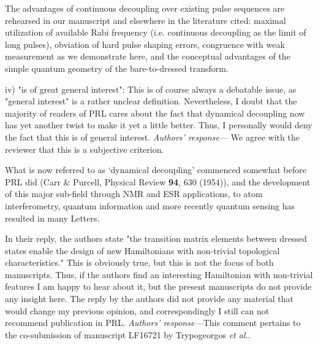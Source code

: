\documentclass[letterpaper]{article}
\newenvironment{refcomment}{\singlespacing\verbatim}{\endverbatim}
\newcommand{\response}{\emph{Authors' response---}}
\begin{document}
The advantages of continuous decoupling over existing pulse sequences are rehearsed in our manuscript and elsewhere in the literature cited: maximal utilization of available Rabi frequency (i.e. continuous decoupling as the limit of long pulses), obviation of hard pulse shaping errors, congruence with weak measurement as we demonstrate here, and the conceptual advantages of the simple quantum geometry of the bare-to-dressed transform.

\begin{refcomment}
iv) "is of great general interest": This is of course always a
debatable issue, as "general interest" is a rather unclear definition.
Nevertheless, I doubt that the majority of readers of PRL cares about
the fact that dynamical decoupling now has yet another twist to make
it yet a little better. Thus, I personally would deny the fact that
this is of general interest.
\end{refcomment}
\response
We agree with the reviewer that this is a subjective criterion.

What is now referred to as `dynamical decoupling' commenced somewhat before PRL did (Carr \& Purcell, Physical Review \textbf{94}, 630 (1954)), and the development of this major sub-field through NMR and ESR applications, to atom interferometry, quantum information and more recently quantum sensing has resulted in many Letters.

\begin{refcomment}
In their reply, the authors state "the transition matrix
elements between dressed states enable the design of
new Hamiltonians with non-trivial topological 
characteristics." This is obviously true, but this is not the focus
of both manuscripts. Thus, if the authors find an interesting
Hamiltonian with non-trivial features I am happy to hear about it, but
the present manuscripts do not provide any insight here. The reply by
the authors did not provide any material that would change my previous
opinion, and correspondingly I still can not recommend publication in
PRL.
\end{refcomment}
\response This comment pertains to the co-submission of manuscript LF16721 by Trypogeorgos \textit{et al.}.
\end{document}
